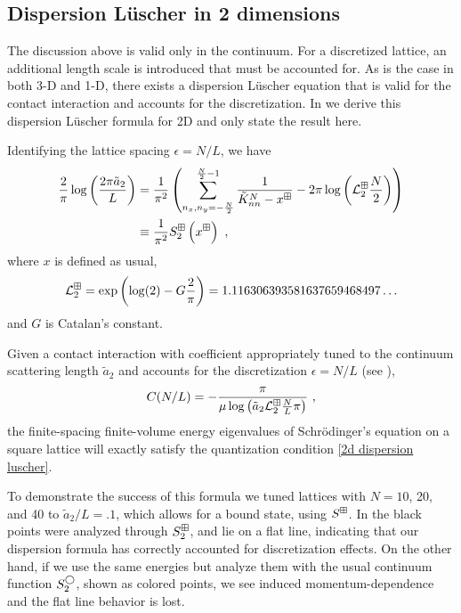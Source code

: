 \subsection{Dispersion L\"uscher in 2 dimensions}

The discussion above is valid only in the continuum.
For a discretized lattice, an additional length scale is introduced that must be accounted for.
As is the case in both 3-D and 1-D, there exists a dispersion L\"uscher equation that is valid for the contact interaction and accounts for the discretization.
In  we derive this dispersion L\"uscher formula for 2D and only state the result here.

Identifying the lattice spacing $\epsilon=N/L$, we have
\begin{align}
    \frac{2}{\pi} \log \left(\frac{2\pi \tilde a_{2}}{L}\right)
    &=
    \frac{1}{\pi^2}
    \left(
        \sum_{n_x,n_y=-\frac{N}{2}}^{\frac{N}{2}-1}\frac{1}{\tilde{K}^N_{nn}-x^\dispersion}
        -2\pi \log \left(\mathcal{L}^\dispersion_2\frac{N}{2}\right)
    \right)
    \nonumber\\
    &\equiv\frac{1}{\pi^2}S^{\dispersion}_2\left(x^\dispersion\right)\ ,\label{eq:2d dispersion luscher}
\end{align}
where $x$ is defined as usual,
\begin{equation}
    \mathcal{L}^\boxplus_{2}
    =
    \exp \left(\log (2)-G \frac{2}{\pi}\right)
    =
    1.116306393581637659468497 \ldots
\end{equation}
and $G$ is Catalan's constant. %

Given a contact interaction with coefficient appropriately tuned to the continuum scattering length $\tilde a_{2}$ and accounts for the discretization $\epsilon=N/L$ (see ),
\begin{equation}
C(N/L)=-\frac{ \pi}{\mu \log \left(\tilde a_{2} \mathcal{L}^\dispersion_2 \frac{N}{L}\pi\right)}\ ,
\end{equation}
the finite-spacing finite-volume energy eigenvalues of Schr\"odinger's equation on a square lattice will exactly satisfy the quantization condition \eqref{2d dispersion luscher}.

To demonstrate the success of this formula we tuned lattices with $N=10$, 20, and 40 to $\tilde a_{2}/L = .1$, which allows for a bound state, using $S^{\boxplus}$.
In  the black points were analyzed through $S^\boxplus_2$, and lie on a flat line, indicating that our dispersion \Luscher formula has correctly accounted for discretization effects.
On the other hand, if we use the same energies but analyze them with the usual continuum \Luscher function $S^{\bigcirc}_2$, shown as colored points, we see induced momentum-dependence and the flat line behavior is lost.

